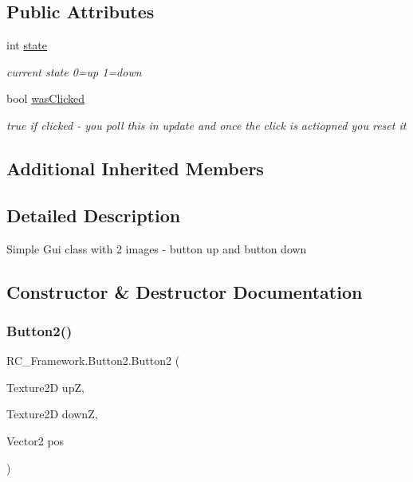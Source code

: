 \subsection*{Public Attributes}
\begin{DoxyCompactItemize}
\item 
int \mbox{\hyperlink{class_r_c___framework_1_1_button2_a7b34b30866f790b3f0c5427bbeec5c91}{state}}
\begin{DoxyCompactList}\small\item\em current state 0=up 1=down \end{DoxyCompactList}\item 
bool \mbox{\hyperlink{class_r_c___framework_1_1_button2_abb085079359e47904684e34467809f00}{was\+Clicked}}
\begin{DoxyCompactList}\small\item\em true if clicked -\/ you poll this in update and once the click is actiopned you reset it \end{DoxyCompactList}\end{DoxyCompactItemize}
\subsection*{Additional Inherited Members}


\subsection{Detailed Description}
Simple Gui class with 2 images -\/ button up and button down 



\subsection{Constructor \& Destructor Documentation}
\mbox{\label{class_r_c___framework_1_1_button2_a59ba03059eb46cc321f6b38a0f5825ba}} 
\subsubsection{\texorpdfstring{Button2()}{Button2()}\hspace{0.1cm}{\footnotesize\ttfamily [1/2]}}
{\footnotesize\ttfamily R\+C\+\_\+\+Framework.\+Button2.\+Button2 (\begin{DoxyParamCaption}\item[{Texture2D}]{upZ,  }\item[{Texture2D}]{downZ,  }\item[{Vector2}]{pos }\end{DoxyParamCaption})}



